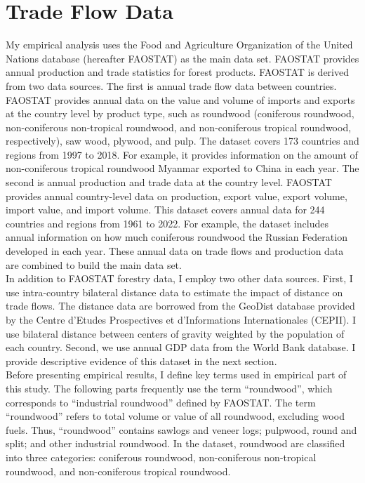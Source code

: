 \documentclass[a4paper,12pt]{article}
\begin{document}
\section{Trade Flow Data}
My empirical analysis uses the Food and Agriculture Organization of the United Nations database (hereafter FAOSTAT) as the main data set. FAOSTAT provides annual production and trade statistics for forest products. FAOSTAT is derived from two data sources. The first is annual trade flow data between countries. FAOSTAT provides annual data on the value and volume of imports and exports at the country level by product type, such as roundwood (coniferous roundwood, non-coniferous non-tropical roundwood, and non-coniferous tropical roundwood, respectively), saw wood, plywood, and pulp. The dataset covers 173 countries and regions from 1997 to 2018. For example, it provides information on the amount of non-coniferous tropical roundwood Myanmar exported to China in each year. The second is annual production and trade data at the country level. FAOSTAT provides annual country-level data on production, export value, export volume, import value, and import volume. This dataset covers annual data for 244 countries and regions from 1961 to 2022. For example, the dataset includes annual information on how much coniferous roundwood the Russian Federation developed in each year. These annual data on trade flows and production data are combined to build the main data set.\\

In addition to FAOSTAT forestry data, I employ two other data sources. First, I use intra-country bilateral distance data to estimate the impact of distance on trade flows. The distance data are borrowed from the GeoDist database provided by the Centre d'Etudes Prospectives et d'Informations Internationales (CEPII). I use bilateral distance between centers of gravity weighted by the population of each country. Second, we use annual GDP data from the World Bank database. I provide descriptive evidence of this dataset in the next section.\\

Before presenting empirical results, I define key terms used in empirical part of this study. The following parts frequently use the term ``roundwood'', which corresponds to ``industrial roundwood'' defined by FAOSTAT. The term ``roundwood'' refers to total volume or value of all roundwood, excluding wood fuels. Thus, ``roundwood'' contains sawlogs and veneer logs; pulpwood, round and split; and other industrial roundwood. In the dataset, roundwood are classified into three categories: coniferous roundwood, non-coniferous non-tropical roundwood, and non-coniferous tropical roundwood.
\end{document}
